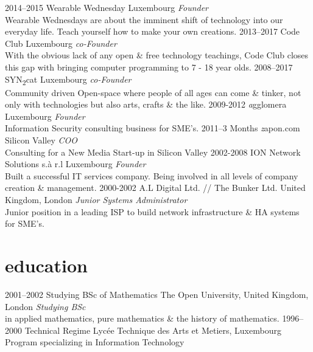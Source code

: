 \documentclass[a4paper]{friggeri-cv} %
\begin{document}
\begin{entrylist}
\entry
{2014--2015}
{Wearable Wednesday}
{Luxembourg}
{\emph{Founder} \\
Wearable Wednesdays are about the imminent shift of technology into our everyday life. Teach yourself how to make your own creations.}
\entry
{2013--2017}
{Code Club}
{Luxembourg}
{\emph{co-Founder} \\
With the obvious lack of any open \& free technology teachings, Code Club closes this gap with bringing computer programming to 7 - 18 year olds.}
\entry
{2008--2017}
{SYN\textsubscript{2}cat}
{Luxembourg}
{\emph{co-Founder} \\
Community driven Open-space where people of all ages can come \& tinker, not only with technologies but also arts, crafts \& the like.}
\entry
{2009-2012}
{\emph{a}gglomera}
{Luxembourg}
{\emph{Founder} \\
Information Security consulting business for SME's.}
\entry
{2011--3 Months}
{\emph{z}apon.com}
{Silicon Valley}
{\emph{COO} \\
Consulting for a New Media Start-up in Silicon Valley}
\entry
{2002-2008}
{ION Network Solutions s.\`{a} r.l}
{Luxembourg}
{\emph{Founder} \\
Built a successful IT services company. Being involved in all levels of company creation \& management.}
\entry
{2000-2002}
{A.L Digital Ltd. // The Bunker Ltd.}
{United Kingdom, London}
{\emph{Junior Systems Administrator} \\
Junior position in a leading ISP to build network infrastructure \& HA systems for SME's.}
\end{entrylist}

\newpage


\section{education}
\begin{entrylist}
\entry
{2001--2002}
{Studying BSc {\normalfont of Mathematics}}
{The Open University, United Kingdom, London}
{\emph{Studying BSc} \\ in applied mathematics, pure mathematics \& the history of mathematics.}
\entry
{1996--2000}
{Technical Regime}
{Lyc\'{e}e Technique des Arts et Metiers, Luxembourg}
{Program specializing in Information Technology}
\end{entrylist}
\end{document}
